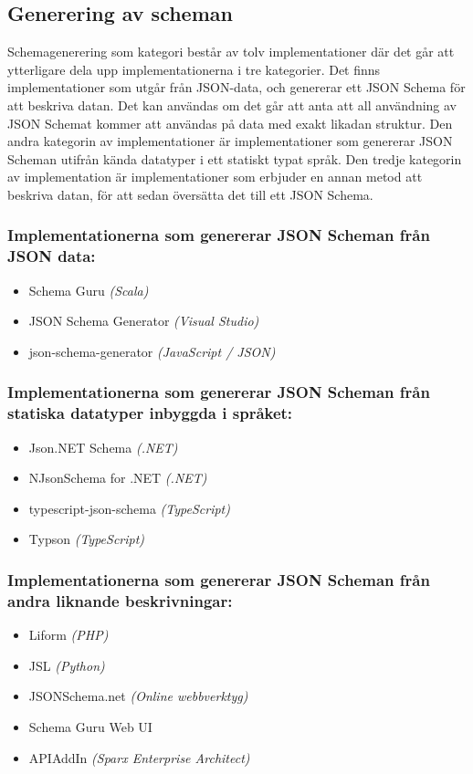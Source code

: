 \subsection{Generering av scheman}
\label{sec:teori:schema-användningsområden:generering}
Schemagenerering som kategori består av tolv implementationer där det går att ytterligare dela upp implementationerna i tre kategorier. Det finns implementationer som utgår från JSON-data, och genererar ett JSON Schema för att beskriva datan. Det kan användas om det går att anta att all användning av JSON Schemat kommer att användas på data med exakt likadan struktur. Den andra kategorin av implementationer är implementationer som genererar JSON Scheman utifrån kända datatyper i ett statiskt typat språk. Den tredje kategorin av implementation är implementationer som erbjuder en annan metod att beskriva datan, för att sedan översätta det till ett JSON Schema. \cite{TheJSONSchemaorganisation}

\subsubsection{Implementationerna som genererar JSON Scheman från JSON data:}
\begin{itemize}
	\item Schema Guru \textit{(Scala)} \cite{Snowplow}
	\item JSON Schema Generator \textit{(Visual Studio)} \cite{MadsKristensen}
	\item json-schema-generator \textit{(JavaScript / JSON)} \cite{Romanovich}
\end{itemize}

\subsubsection{Implementationerna som genererar JSON Scheman från statiska datatyper inbyggda i språket:}
\begin{itemize}
	\item Json.NET Schema \textit{(.NET)} \cite{Newtonsoft}
	\item NJsonSchema for .NET \textit{(.NET)} \cite{Suter}
	\item typescript-json-schema \textit{(TypeScript)} \cite{El-Dardiry}
	\item Typson \textit{(TypeScript)} \cite{Bovet}
\end{itemize}

\subsubsection{Implementationerna som genererar JSON Scheman från andra liknande beskrivningar:}
\begin{itemize}
	\item Liform \textit{(PHP)} \cite{Limenius}
	\item JSL \textit{(Python)} \cite{Romanovich}
	\item JSONSchema.net \textit{(Online webbverktyg)} \cite{Bovet}
	\item Schema Guru Web UI
	\item APIAddIn \textit{(Sparx Enterprise Architect)} \cite{Tomlinson}
\end{itemize}

